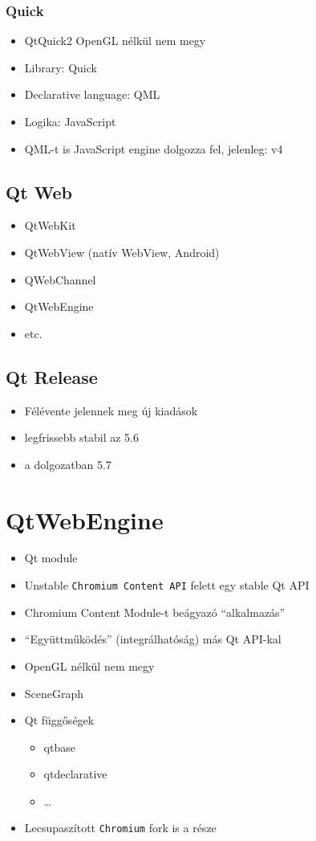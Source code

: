 \documentclass[12pt]{report}
\begin{document}
\subsubsection{Quick}
\begin{itemize}
    \item QtQuick2 OpenGL nélkül nem megy
    \item Library: Quick
    \item Declarative language: QML
    \item Logika: JavaScript
    \item QML-t is JavaScript engine dolgozza fel, jelenleg: v4
\end{itemize}

\subsection{Qt Web}
\begin{itemize}
    \item QtWebKit
    \item QtWebView (natív WebView, Android)
    \item QWebChannel
    \item QtWebEngine
    \item etc.
\end{itemize}

\subsection{Qt Release}
\begin{itemize}
    \item Félévente jelennek meg új kiadások
    \item legfrissebb stabil az 5.6
    \item a dolgozatban 5.7
\end{itemize}

\section{QtWebEngine}
\begin{itemize}
    \item Qt module
    \item Unstable \texttt{Chromium Content API} felett egy stable Qt API
    \item Chromium Content Module-t beágyazó ``alkalmazás''
    \item ``Együttműködés'' (integrálhatóság) más Qt API-kal
    \item OpenGL nélkül nem megy
    \item SceneGraph
    \item Qt függőségek
        \begin{itemize}
            \item qtbase
            \item qtdeclarative
            \item \dots
        \end{itemize}
    \item Lecsupaszított \texttt{Chromium} fork is a része
\end{itemize}
\end{document}
